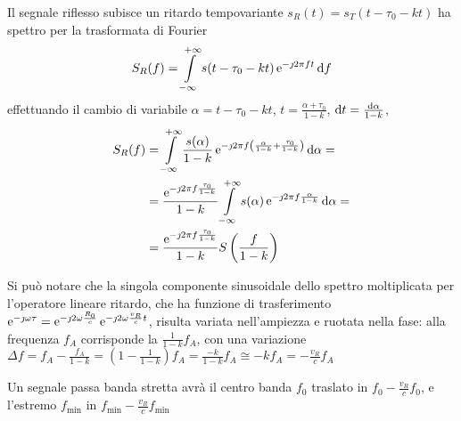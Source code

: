 Il segnale riflesso subisce un ritardo tempovariante $s_R(t)=s_T(t-\tau_0-k t)$ ha spettro per la trasformata di Fourier
\[S_R(f)=\int\limits_{-\infty}^{+\infty}{s(t-\tau_0-k t)\operatorname{e}^{-\jmath 2\pi f t}}{\,\mathop{}\!\mathrm{d}{f}}\]
effettuando il cambio di variabile $\alpha=t-\tau_0-k t$, $t=\frac{\alpha+\tau_0}{1-k}$, $\mathop{}\!\mathrm{d} t=\frac{\mathop{}\!\mathrm{d}\alpha}{1-k}$,
\[\begin{split}S_R(f)&=\int\limits_{-\infty}^{+\infty}{\frac{s(\alpha)}{1-k}\operatorname{e}^{-\jmath 2\pi f\left(\frac{\alpha}{1-k}+\frac{\tau_0}{1-k}\right)}}{\,\mathop{}\!\mathrm{d}{\alpha}}=\\
&=\frac{\operatorname{e}^{-\jmath 2\pi f\frac{\tau_0}{1-k}}}{1-k}\int\limits_{-\infty}^{+\infty}{s(\alpha)\operatorname{e}^{-\jmath 2\pi f\frac{\alpha}{1-k}}}{\,\mathop{}\!\mathrm{d}{\alpha}}=\\
&=\frac{\operatorname{e}^{-\jmath 2\pi f\frac{\tau_0}{1-k}}}{1-k} S\left(\frac{f}{1-k}\right)\end{split}\]

Si può notare che la singola componente sinusoidale dello spettro moltiplicata per l'operatore lineare ritardo, che ha funzione di trasferimento $\operatorname{e}^{-\jmath\omega\tau}=\operatorname{e}^{-\jmath 2\omega\frac{R_0}{c}}\operatorname{e}^{-\jmath 2\omega\frac{v_R}{c}t}$, risulta variata nell'ampiezza e ruotata nella fase: alla frequenza $f_A$ corrisponde la $\frac{1}{1-k}f_A$, con una variazione $\Delta f=f_A-\frac{f_A}{1-k}=\left(1-\frac{1}{1-k}\right)f_A=\frac{-k}{1-k}f_A\cong-k f_A=-\frac{v_R}{c}f_A$

Un segnale passa banda stretta avrà il centro banda $f_0$ traslato in $f_0-\frac{v_R}{c}f_0$, e l'estremo $f_\text{min}$ in $f_\text{min}-\frac{v_R}{c}f_\text{min}$
\begin{figure}[ht!]\centering
	\def\fmin{500.}\def\fmax{3000.}
	\def\fmina{450.}\def\fmaxa{2700.}
\end{figure}

